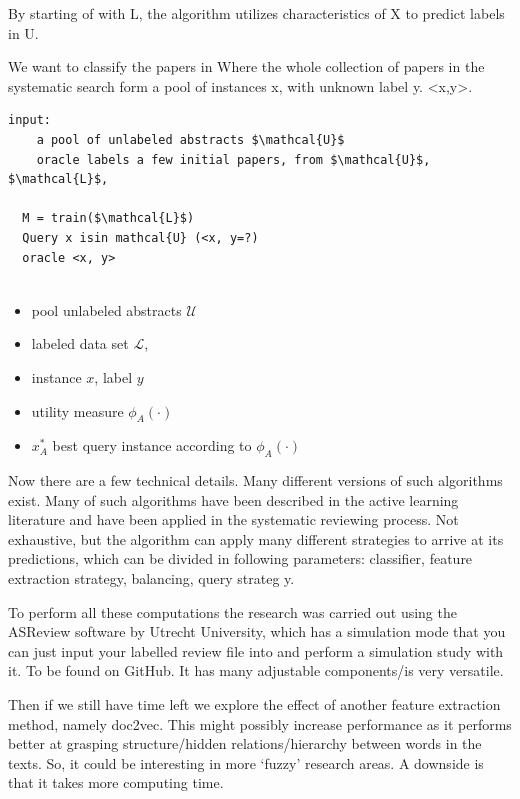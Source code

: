 \documentclass[
]{article}
\begin{document}
By starting of with L, the algorithm utilizes characteristics of X to
predict labels in U.

We want to classify the papers in Where the whole collection of papers
in the systematic search form a pool of instances x, with unknown label
y. \textless x,y\textgreater.

\begin{verbatim}
input:  
    a pool of unlabeled abstracts $\mathcal{U}$ 
    oracle labels a few initial papers, from $\mathcal{U}$, $\mathcal{L}$, 

  M = train($\mathcal{L}$)
  Query x isin mathcal{U} (<x, y=?)
  oracle <x, y>
  
\end{verbatim}

\begin{itemize}
\item
  pool unlabeled abstracts \(\mathcal{U}\)
\item
  labeled data set \(\mathcal{L}\),
\item
  instance \(x\), label \(y\)
\item
  utility measure \(\phi_A(\cdot)\)
\item
  \(x^*_A\) best query instance according to \(\phi_A(\cdot)\)
\end{itemize}

Now there are a few technical details. Many different versions of such
algorithms exist. Many of such algorithms have been described in the
active learning literature and have been applied in the systematic
reviewing process. Not exhaustive, but the algorithm can apply many
different strategies to arrive at its predictions, which can be divided
in following parameters: classifier, feature extraction strategy,
balancing, query strateg y.

To perform all these computations the research was carried out using the
ASReview software by Utrecht University, which has a simulation mode
that you can just input your labelled review file into and perform a
simulation study with it. To be found on GitHub. It has many adjustable
components/is very versatile.

Then if we still have time left we explore the effect of another feature
extraction method, namely doc2vec. This might possibly increase
performance as it performs better at grasping structure/hidden
relations/hierarchy between words in the texts. So, it could be
interesting in more `fuzzy' research areas. A downside is that it takes
more computing time.
\end{document}
